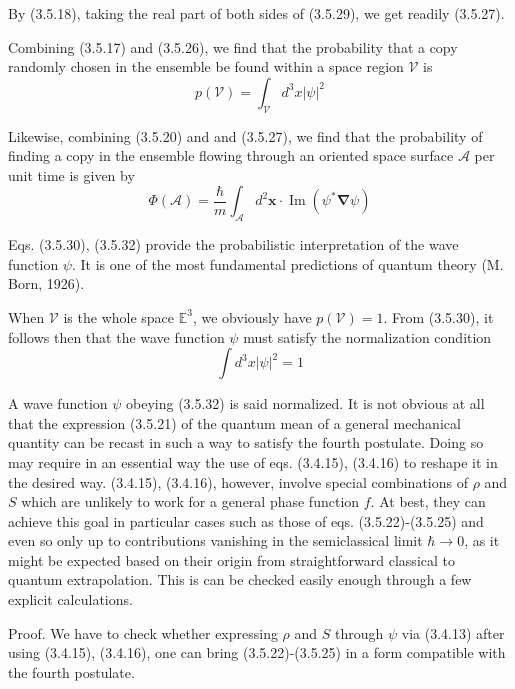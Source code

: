 \documentclass{article}
\begin{document}
By (3.5.18), taking the real part of both sides of (3.5.29), we get readily (3.5.27).

Combining (3.5.17) and (3.5.26), we find that the probability that a copy randomly chosen in the ensemble be found within a space region $\mathcal{V}$ is
$$
\begin{equation*}
p(\mathcal{V})=\int_{\mathcal{V}} d^{3} x|\psi|^{2} \tag{3.5.30}
\end{equation*}
$$

Likewise, combining (3.5.20) and and (3.5.27), we find that the probability of finding a copy in the ensemble flowing through an oriented space surface $\mathcal{A}$ per unit time is given by
$$
\begin{equation*}
\Phi(\mathcal{A})=\frac{\hbar}{m} \int_{\mathcal{A}} d^{2} \boldsymbol{x} \cdot \operatorname{Im}\left(\psi^{*} \boldsymbol{\nabla} \psi\right) \tag{3.5.31}
\end{equation*}
$$

Eqs. (3.5.30), (3.5.32) provide the probabilistic interpretation of the wave function $\psi$. It is one of the most fundamental predictions of quantum theory (M. Born, 1926).

When $\mathcal{V}$ is the whole space $\mathbb{E}^{3}$, we obviously have $p(\mathcal{V})=1$. From (3.5.30), it follows then that the wave function $\psi$ must satisfy the normalization condition
$$
\begin{equation*}
\int d^{3} x|\psi|^{2}=1 \tag{3.5.32}
\end{equation*}
$$

A wave function $\psi$ obeying (3.5.32) is said normalized.
It is not obvious at all that the expression (3.5.21) of the quantum mean of a general mechanical quantity can be recast in such a way to satisfy the fourth postulate. Doing so may require in an essential way the use of eqs. (3.4.15), (3.4.16) to reshape it in the desired way. (3.4.15), (3.4.16), however, involve special combinations of $\rho$ and $S$ which are unlikely to work for a general phase function $f$. At best, they can achieve this goal in particular cases such as those of eqs. (3.5.22)-(3.5.25) and even so only up to contributions vanishing in the semiclassical limit $\hbar \rightarrow 0$, as it might be expected based on their origin from straightforward classical to quantum extrapolation. This is can be checked easily enough through a few explicit calculations.

Proof. We have to check whether expressing $\rho$ and $S$ through $\psi$ via (3.4.13) after using (3.4.15), (3.4.16), one can bring (3.5.22)-(3.5.25) in a form compatible with the fourth postulate.
\end{document}

